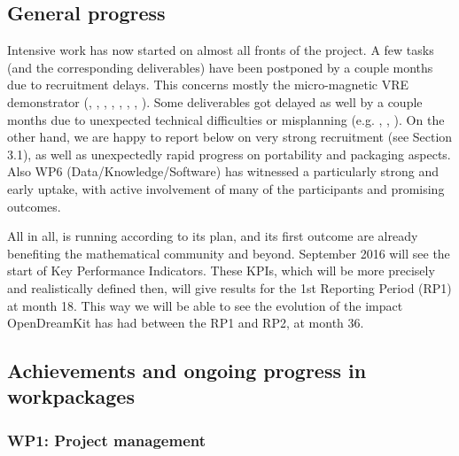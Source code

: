 \documentclass{deliverablereport}
\begin{document}
\subsection{General progress}


Intensive work has now started on almost all fronts of the project. A
few tasks (and the corresponding deliverables) have been postponed by
a couple months due to recruitment delays. This concerns mostly the
micro-magnetic VRE demonstrator (, ,
 , , , ,
 , ). Some deliverables got delayed as well
by a couple months due to unexpected technical difficulties or
misplanning (e.g. ,
, ). On
the other hand, we are happy to report below on very strong
recruitment (see Section 3.1), as well as unexpectedly rapid
progress on portability and packaging aspects. Also WP6
(Data/Knowledge/Software) has witnessed a particularly strong and
early uptake, with active involvement of many of the participants and
promising outcomes.

All in all, \ODK is running according to its plan, and its first
outcome are already benefiting the mathematical community and beyond. September 2016 will see the start of Key Performance Indicators. 
These KPIs, which will be more precisely and realistically defined then, will give results for the 1st Reporting Period (RP1) at month 18. 
This way we will be able to see the evolution of the impact OpenDreamKit has had between the RP1 and RP2, at month 36.


\subsection{Achievements and ongoing progress in workpackages}

\subsubsection{WP1: Project management}
\end{document}
